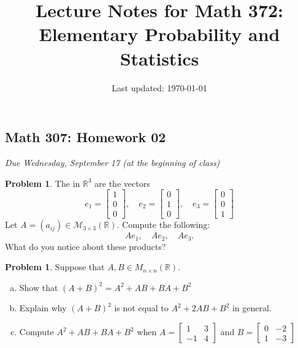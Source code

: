 \documentclass[10pt]{article}
\title{Lecture Notes for Math 372: \\Elementary Probability and Statistics}
\date{Last updated: \today}
\theoremstyle{definition}
\newtheorem{problem}[theorem]{Problem}
\newcommand{\1}[1]{\textbf{1}_{\left[#1\right]}} %
\def\R{\mathbb{R}} %
\newcommand{\dempfcolor}[1]{{\color{RoyalBlue}#1}}
\newcommand{\demph}[1]{\dempfcolor{{\sl #1}}}
\begin{document}
\begin{center}
  \section*{Math 307: Homework 02}
  \textit{Due Wednesday, September 17 (at the beginning of class)}
\end{center}
\begin{problem}
  The \demph{standard unit vectors} in $\R^{3}$ are the vectors 
  \begin{equation*}
    e_{1}  =
    \begin{bmatrix}
      1\\0\\0
    \end{bmatrix},
    \quad
    e_{2}  =
    \begin{bmatrix}
      0\\1\\0
    \end{bmatrix},
    \quad
    e_{3}  =
    \begin{bmatrix}
      0\\0\\1
    \end{bmatrix}
  \end{equation*}
  Let $A=(a_{ij})\in \mathcal{M}_{3\times 3}(\R)$. Compute the following:
  \begin{equation*}
    Ae_{1}, \quad Ae_{2}, \quad Ae_{3}.
  \end{equation*}
  What do you notice about these products?
\end{problem}


\begin{problem}
  Suppose that $A,B\in M_{n\times n}(\R).$
  \begin{enumerate}[(a)]
    \item Show that $(A+B)^{2}=A^{2}+AB+BA+B^{2}$
    \item Explain why $(A+B)^{2}$ is not equal to $A^{2}+2AB+B^{2}$ in
    general.
    \item Compute $A^{2}+AB+BA+B^{2}$ when $A=
    \begin{bmatrix}
      1&3\\
      -1&4
    \end{bmatrix}
    $
    and $B=
    \begin{bmatrix}
      0&-2\\
      1&-3
    \end{bmatrix}
    $ 
  \end{enumerate}
\end{problem}
\end{document}

